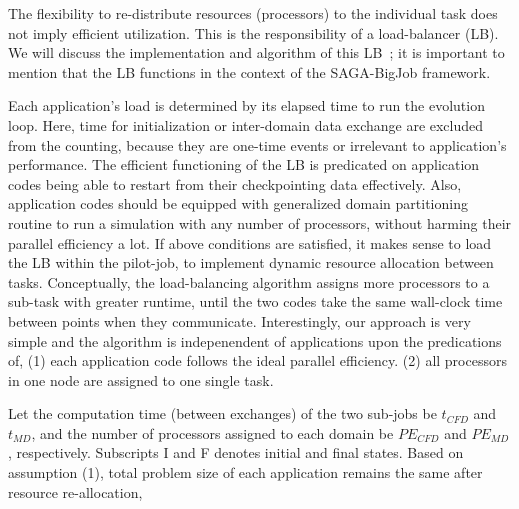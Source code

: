 \documentclass[conference,final]{IEEEtran}
\newcommand{\athotanote}[1]{ {\textcolor{green} { ***athota: #1 }}}
\begin{document}


The flexibility to re-distribute resources (processors) to the
individual task does not imply efficient utilization. This is the
responsibility of a load-balancer (LB). We will discuss the
implementation and algorithm of this LB~\cite{Ko}; it is important to mention
that the LB functions in the context of the SAGA-BigJob framework.

Each application's load is determined by its elapsed time to run the
evolution loop. Here, time for initialization or inter-domain data
exchange are excluded from the counting, because they are one-time
events or irrelevant to application's performance.  The efficient
functioning of the LB is predicated on application codes being able to
restart from their checkpointing data effectively.  Also, application
codes should be equipped with generalized domain partitioning routine
to run a simulation with any number of processors, without harming
their parallel efficiency a lot. If above conditions are satisfied, it
makes sense to load the LB within the pilot-job, to implement dynamic
resource allocation between tasks.  Conceptually, the load-balancing
algorithm assigns more processors to a sub-task with greater runtime,
until the two codes take the same wall-clock time between points when they
communicate.
Interestingly, our approach is very simple and the
algorithm is indepenendent of applications 
upon the predications of,
(1) each application code follows the ideal parallel efficiency.
(2) all processors in one node are assigned to one single task.

Let the computation time (between exchanges) of the two sub-jobs be
$t_{CFD}$ and $t_{MD}$, and the number of processors assigned to each
domain be $PE_{CFD}$ and $PE_{MD}$, respectively. Subscripts I and F
denotes initial and final states. Based on assumption (1), total
problem size of each application remains the same after resource
re-allocation,
\end{document}
